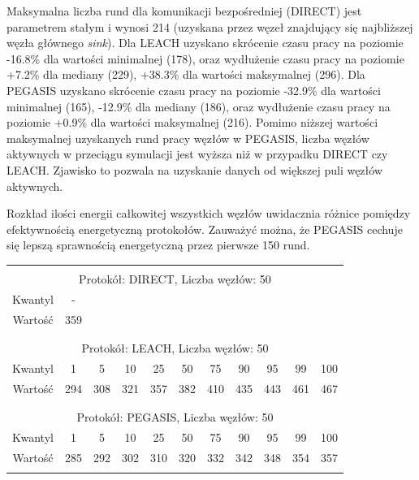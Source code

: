 \documentclass[a4paper,12pt,twoside,openany]{report}
\begin{document}
\par
Maksymalna liczba rund dla komunikacji bezpośredniej (DIRECT) jest parametrem stałym i wynosi 214 (uzyskana przez węzeł znajdujący się najbliższej węzła głównego \textit{sink}).
Dla LEACH uzyskano skrócenie czasu pracy na poziomie -16.8\% dla wartości minimalnej (178), oraz wydłużenie czasu pracy na poziomie +7.2\% dla mediany (229), +38.3\% dla wartości maksymalnej (296).
Dla PEGASIS uzyskano skrócenie czasu pracy na poziomie -32.9\% dla wartości minimalnej (165), -12.9\% dla mediany (186), oraz wydłużenie czasu pracy na poziomie +0.9\% dla wartości maksymalnej (216).
Pomimo niższej wartości maksymalnej uzyskanych rund pracy węzłów w PEGASIS, liczba węzłów aktywnych w przeciągu symulacji jest wyższa niż w przypadku DIRECT czy LEACH.
Zjawisko to pozwala na uzyskanie danych od większej puli węzłów aktywnych.
\par
Rozkład ilości energii całkowitej wszystkich węzłów uwidacznia różnice pomiędzy efektywnością energetyczną protokołów.
Zauważyć można, że PEGASIS cechuje się lepszą sprawnością energetyczną przez pierwsze 150 rund.

\begin{longtable}{*{11}{c}}
\toprule \\*
\multicolumn{11}{c}{Protokół: DIRECT, Liczba węzłów: 50} \\*
Kwantyl	& -	\\*
Wartość	& 359	\\*
\midrule \\*
\\*
\multicolumn{11}{c}{Protokół: LEACH, Liczba węzłów: 50} \\*
Kwantyl	& 1	& 5	& 10	& 25	& 50	& 75	& 90	& 95	& 99	& 100	\\*
Wartość	& 294	& 308	& 321	& 357	& 382	& 410	& 435	& 443	& 461	& 467	\\*
\midrule \\*
\\*
\multicolumn{11}{c}{Protokół: PEGASIS, Liczba węzłów: 50} \\*
Kwantyl	& 1	& 5	& 10	& 25	& 50	& 75	& 90	& 95	& 99	& 100	\\*
Wartość	& 285	& 292	& 302	& 310	& 320	& 332	& 342	& 348	& 354	& 357	\\*
\bottomrule \\*
\end{longtable}
\end{document}
